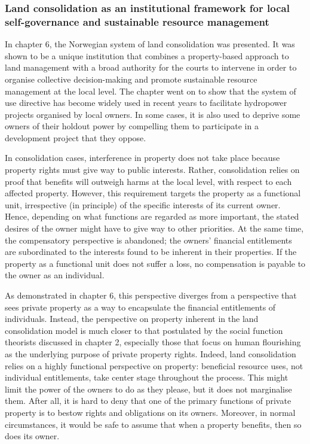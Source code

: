 \subsubsection*{Land consolidation as an institutional framework for local self-governance and sustainable resource management}

In chapter 6, the Norwegian system of land consolidation was presented. It was shown to be a unique institution that combines a property-based approach to land management with a broad authority for the courts to intervene in order to organise collective decision-making and promote sustainable resource management at the local level. The chapter went on to show that the system of use directive has become widely used in recent years to facilitate hydropower projects organised by local owners. In some cases, it is also used to deprive some owners of their holdout power by compelling them to participate in a development project that they oppose.

In consolidation cases, interference in property does not take place because property rights must give way to public interests. Rather, consolidation relies on proof that benefits will outweigh harms at the local level, with respect to each affected property. However, this requirement targets the property as a functional unit, irrespective (in principle) of the specific interests of its current owner. Hence, depending on what functions are regarded as more important, the stated desires of the owner might have to give way to other priorities. At the same time, the compensatory perspective is abandoned; the owners' financial entitlements are subordinated to the interests found to be inherent in their properties. If the property as a functional unit does not suffer a loss, no compensation is payable to the owner as an individual. 

As demonstrated in chapter 6, this perspective diverges from a perspective that sees private property as a way to encapsulate the financial entitlements of individuals. Instead, the perspective on property inherent in the land consolidation model is much closer to that postulated by the social function theorists discussed in chapter 2, especially those that focus on human flourishing as the underlying purpose of private property rights. Indeed, land consolidation relies on a highly functional perspective on property: beneficial resource uses, not individual entitlements, take center stage throughout the process. This might limit the power of the owners to do as they please, but it does not marginalise them. After all, it is hard to deny that one of the primary functions of private property is to bestow rights and obligations on its owners. Moreover, in normal circumstances, it would be safe to assume that when a property benefits, then so does its owner.


